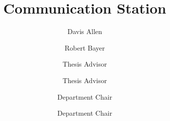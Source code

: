 \documentclass{scu-thesis}
\author{Davis Allen}
\author{Robert Bayer}
\title{Communication Station}
\begin{document}
\frontmatter
\signature{Thesis Advisor}
\signature{Thesis Advisor}
\signature{Department Chair}
\signature{Department Chair}

\maketitle


\tableofcontents
\listoffigures

\mainmatter
















\backmatter
\end{document}
